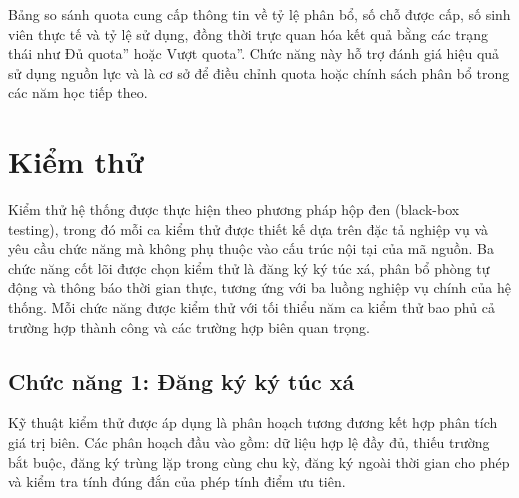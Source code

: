 \documentclass[../DoAn.tex]{subfiles}
\begin{document}
Bảng so sánh quota cung cấp thông tin về tỷ lệ phân bổ, số chỗ được cấp, số sinh viên thực tế và tỷ lệ sử dụng, đồng thời trực quan hóa kết quả bằng các trạng thái như Đủ quota'' hoặc Vượt quota''. Chức năng này hỗ trợ đánh giá hiệu quả sử dụng nguồn lực và là cơ sở để điều chỉnh quota hoặc chính sách phân bổ trong các năm học tiếp theo.

\section{Kiểm thử}
\label{sec:testing}

Kiểm thử hệ thống được thực hiện theo phương pháp hộp đen (black-box testing),
trong đó mỗi ca kiểm thử được thiết kế dựa trên đặc tả nghiệp vụ và yêu cầu
chức năng mà không phụ thuộc vào cấu trúc nội tại của mã nguồn. Ba chức năng
cốt lõi được chọn kiểm thử là đăng ký ký túc xá, phân bổ phòng tự động và thông
báo thời gian thực, tương ứng với ba luồng nghiệp vụ chính của hệ thống. Mỗi
chức năng được kiểm thử với tối thiểu năm ca kiểm thử bao phủ cả trường hợp
thành công và các trường hợp biên quan trọng.

\subsection*{Chức năng 1: Đăng ký ký túc xá}

Kỹ thuật kiểm thử được áp dụng là phân hoạch tương đương kết hợp phân tích giá trị biên. Các
phân hoạch đầu vào gồm: dữ liệu hợp lệ đầy đủ, thiếu trường bắt buộc, đăng ký
trùng lặp trong cùng chu kỳ, đăng ký ngoài thời gian cho phép và kiểm tra tính
đúng đắn của phép tính điểm ưu tiên.
\end{document}

